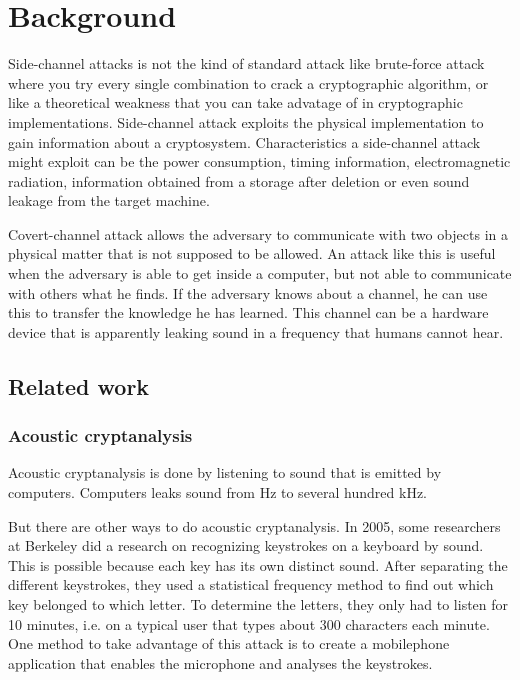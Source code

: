 \chapter{Background}
\label{chp:background} 

Side-channel attacks is not the kind of standard attack like brute-force attack where you try every single combination to crack a cryptographic algorithm, or like a theoretical weakness that you can take advatage of in cryptographic implementations. 
Side-channel attack exploits the physical implementation to gain information about a cryptosystem.
Characteristics a side-channel attack might exploit can be the power consumption, timing information, electromagnetic radiation, information obtained from a storage after deletion or even sound leakage from the target machine.

Covert-channel attack allows the adversary to communicate with two objects in a physical matter that is not supposed to be allowed. An attack like this is useful when the adversary is able to get inside a computer, but not able to communicate with others what he finds. 
If the adversary knows about a channel, he can use this to transfer the knowledge he has learned.
This channel can be a hardware device that is apparently leaking sound in a frequency that humans cannot hear.


\section{Related work}\label{sec:related_work}

\subsection{Acoustic cryptanalysis}\label{sec:acoustic_cryptanalysis}

Acoustic cryptanalysis is done by listening to sound that is emitted by computers. 
Computers leaks sound from Hz to several hundred kHz. 

But there are other ways to do acoustic cryptanalysis. In 2005, some researchers at Berkeley did a research\cite{url:keystrokes} on recognizing keystrokes on a keyboard by sound. 
This is possible because each key has its own distinct sound. 
After separating the different keystrokes, they used a statistical frequency method to find out which key belonged to which letter. 
To determine the letters, they only had to listen for 10 minutes, i.e. on a typical user that types about 300 characters each minute. 
One method to take advantage of this attack is to create a mobilephone application that enables the microphone and analyses the keystrokes. 

